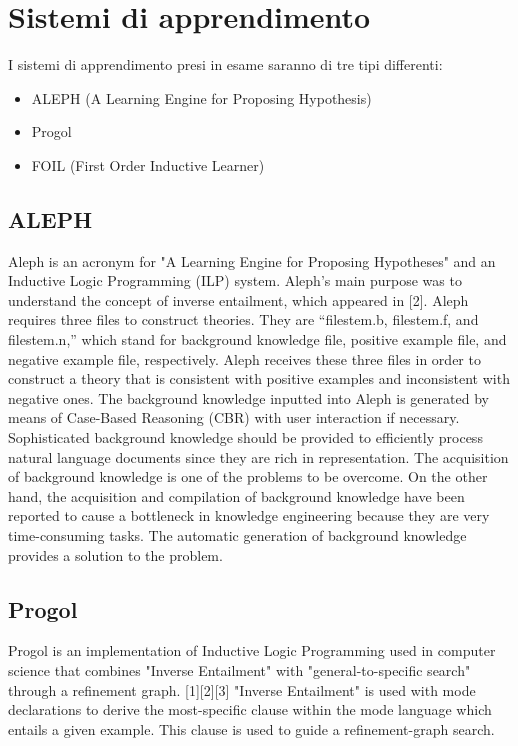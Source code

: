 \section{Sistemi di apprendimento}

I sistemi di apprendimento presi in esame saranno di tre tipi differenti:

\begin{itemize}
	\item ALEPH (A Learning Engine for Proposing Hypothesis)
	\item Progol 
	\item FOIL (First Order Inductive Learner)
\end{itemize}

\subsection{ALEPH}
Aleph is an acronym for "A Learning Engine for Proposing Hypotheses" and an Inductive Logic Programming (ILP) system. Aleph’s main purpose was to understand the concept of inverse entailment, which appeared in [2]. Aleph requires three files to construct theories. They are “filestem.b, filestem.f, and filestem.n,” which stand for background knowledge file, positive example file, and negative example file, respectively. Aleph receives these three files in order to construct a theory that is consistent with positive examples and inconsistent with negative ones.
The background knowledge inputted into Aleph is generated by means of Case-Based Reasoning (CBR) with user interaction if necessary. Sophisticated background knowledge should be provided to efficiently process natural language documents since they are rich in representation. The acquisition of background knowledge is one of the problems to be overcome. On the other hand, the acquisition and compilation of background knowledge have been reported to cause a bottleneck in knowledge engineering because they are very time-consuming tasks. The automatic generation of background knowledge provides a solution to the problem.

\subsection{Progol}
Progol is an implementation of Inductive Logic Programming used in computer science that combines "Inverse Entailment" with "general-to-specific search" through a refinement graph. [1][2][3] "Inverse Entailment" is used with mode declarations to derive the most-specific clause within the mode language which entails a given example. This clause is used to guide a refinement-graph search.

